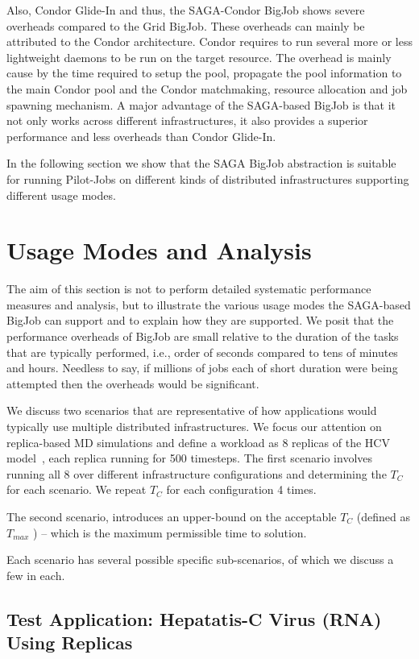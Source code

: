 \documentclass[conference,final]{IEEEtran}
\newcommand{\numrep}{8 }
\newcommand{\samplenum}{4 }
\newcommand{\tmax}{$T_{max}$ }
\newcommand{\tc}{$T_{C}$ }
\begin{document}
Also, Condor Glide-In and thus, the SAGA-Condor BigJob shows severe 
overheads compared to the Grid BigJob. These overheads can mainly be 
attributed to the Condor architecture. Condor requires to run several more or less 
lightweight daemons to be run on the target resource. The overhead is mainly 
cause by the time required to setup the pool, propagate the pool information 
to the main Condor pool and the Condor matchmaking, resource allocation and 
job spawning mechanism. A major advantage of the SAGA-based BigJob is that
it not only works across different infrastructures, it also provides a superior
performance and less overheads than Condor Glide-In.

In the following section we show that the SAGA BigJob abstraction is
suitable for running Pilot-Jobs on different kinds of distributed
infrastructures supporting different usage modes.

\section{Usage Modes and Analysis}


The aim of this section is not to perform detailed systematic
performance measures and analysis, but to illustrate the various usage
modes the SAGA-based BigJob can support and to explain how they are supported. We
posit that the performance overheads of BigJob are small relative to
the duration of the tasks that are typically performed, i.e., order of
seconds compared to tens of minutes and hours.  Needless to say, if
millions of jobs each of short duration were being attempted then the
overheads would be significant.

We discuss two scenarios that are representative of how applications
would typically use multiple distributed infrastructures. We focus our
attention on replica-based MD simulations and define a workload as
\numrep replicas of the HCV model~\cite{}, each replica running for
500 timesteps.  The first scenario involves running all \numrep over
different infrastructure configurations and determining the \tc for
each scenario. We repeat \tc for each configuration \samplenum times.

The second scenario, introduces an upper-bound on the acceptable \tc
(defined as \tmax) -- which is the maximum permissible time to
solution.

Each scenario has several possible specific sub-scenarios, of which we
discuss a few in each.

\subsection{Test Application: Hepatatis-C Virus (RNA) Using
  Replicas}
\end{document}
